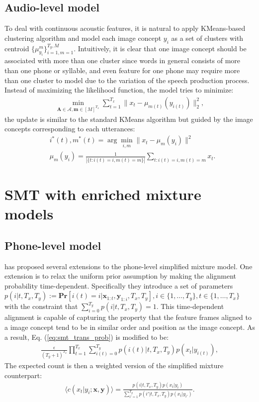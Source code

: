 \documentclass[journal]{IEEEtran}
\begin{document}
\subsection{Audio-level model}
To deal with continuous acoustic features, it is natural to apply
KMeans-based clustering algorithm and model each image concept $y_i$ as a set of clusters with centroid $\{\mu_{y_i}^m\}_{i=1, m=1}^{T_y, M}$. Intuitively, it is clear that one image concept should be associated with more than one cluster since words in general consists of more than one phone or syllable, and even feature for one phone may require more than one cluster to model due to the variation of the speech production process. Instead of maximizing the likelihood function, the model tries to minimize:
\begin{align}\label{eq:multimodal_kmeans_obj}
    \min_{\mathbf A \in \mathcal A, \mathbf m \in [M]^{T_x}} \sum_{t=1}^{T_x} \|x_t - \mu_{m(t)}(y_{i(t)})\|^2_2,
\end{align}
the update is similar to the standard KMeans algorithm but guided by the image concepts corresponding to each utterances:
\begin{align}\label{eq:multimodal_kmeans_update}
    &i^*(t), m^*(t) = \arg\min_{i, m}\|x_t - \mu_m(y_{i})\|^2\\
    &\mu_m(y_i) = \frac{1}{|\{t:i(t)=i, m(t)=m\}|}\sum_{t: i(t)=i, m(t)=m} x_t.
\end{align}


\section{SMT with enriched mixture models}
\subsection{Phone-level model}
\cite{Brown92} has proposed several extensions to the phone-level simplified mixture model. One extension is to relax the uniform prior assumption by making the alignment probability time-dependent. Specifically they introduce a set of parameters $p(i|t, T_x, T_y) := \mathbf{Pr}[i(t) = i|\mathbf x_{1:t}, \mathbf y_{1:i}, T_x, T_y], i\in \{1,\ldots,T_y\}, t\in \{1,\ldots,T_x\}$ with the constraint that $\sum_{i=0}^{T_y} p(i|t, T_x, T_y) = 1$. This time-dependent alignment is capable of capturing the property that the feature frames aligned to a image concept tend to be in similar order and position as the image concept. As a result, Eq. (\ref{eq:smt_trans_prob}) is modified to be:
\begin{align}
    \frac{\epsilon}{(T_y+1)^{T_x}}\prod_{t=1}^{T_x} \sum_{i(t)=0}^{T_y}p(i(t)|t, T_x, T_y) p(x_t|y_{i(t)}),
\end{align}
The expected count is then a weighted version of the simplified mixture counterpart:
\begin{align}
\label{eq:expected_count_ibm2}
    \langle c(x_t|y_i; \mathbf x, \mathbf y) \rangle = \frac{p(i|t, T_x, T_y) p(x_t|y_i)}{\sum_{i'=1}^{T_y}p(i'|t, T_x, T_y) p(x_t|y_{i'})}.
\end{align}
\end{document}
